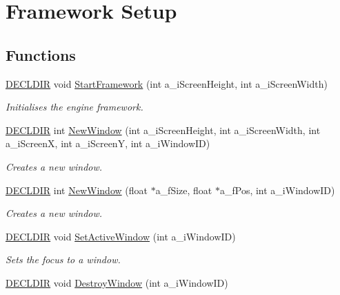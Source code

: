 \hypertarget{group___setup}{\section{Framework Setup}
\label{group___setup}
}
\subsection*{Functions}
\begin{DoxyCompactItemize}
\item 
\hyperlink{_framework_8h_a6b6635274dbcf57e29a0140cd8cf0305}{D\-E\-C\-L\-D\-I\-R} void \hyperlink{group___setup_gabbec082e10c34db627e36cc013145edf}{Start\-Framework} (int a\-\_\-i\-Screen\-Height, int a\-\_\-i\-Screen\-Width)
\begin{DoxyCompactList}\small\item\em Initialises the engine framework. \end{DoxyCompactList}\item 
\hyperlink{_framework_8h_a6b6635274dbcf57e29a0140cd8cf0305}{D\-E\-C\-L\-D\-I\-R} int \hyperlink{group___setup_ga56342962a8d02fd6385140819bb0e82f}{New\-Window} (int a\-\_\-i\-Screen\-Height, int a\-\_\-i\-Screen\-Width, int a\-\_\-i\-Screen\-X, int a\-\_\-i\-Screen\-Y, int a\-\_\-i\-Window\-I\-D)
\begin{DoxyCompactList}\small\item\em Creates a new window. \end{DoxyCompactList}\item 
\hyperlink{_framework_8h_a6b6635274dbcf57e29a0140cd8cf0305}{D\-E\-C\-L\-D\-I\-R} int \hyperlink{group___setup_ga3eb385f36a4ae1aa2557b8abfb94597e}{New\-Window} (float $\ast$a\-\_\-f\-Size, float $\ast$a\-\_\-f\-Pos, int a\-\_\-i\-Window\-I\-D)
\begin{DoxyCompactList}\small\item\em Creates a new window. \end{DoxyCompactList}\item 
\hyperlink{_framework_8h_a6b6635274dbcf57e29a0140cd8cf0305}{D\-E\-C\-L\-D\-I\-R} void \hyperlink{group___setup_gae8b13dc3b384b857ebb5b677ae643c5f}{Set\-Active\-Window} (int a\-\_\-i\-Window\-I\-D)
\begin{DoxyCompactList}\small\item\em Sets the focus to a window. \end{DoxyCompactList}\item 
\hyperlink{_framework_8h_a6b6635274dbcf57e29a0140cd8cf0305}{D\-E\-C\-L\-D\-I\-R} void \hyperlink{group___setup_ga309430fcc990496bc84b4e9ec75eeb55}{Destroy\-Window} (int a\-\_\-i\-Window\-I\-D)

\end{DoxyCompactItemize}
